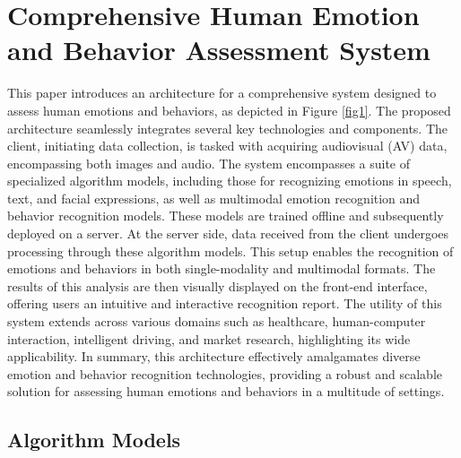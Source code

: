 \documentclass[preprint,12pt]{elsarticle}
\begin{document}
\section{Comprehensive Human Emotion and Behavior Assessment System}

This paper introduces an architecture for a comprehensive system designed to assess human emotions and behaviors, as depicted in Figure \ref{fig1}. The proposed architecture seamlessly integrates several key technologies and components. The client, initiating data collection, is tasked with acquiring audiovisual (AV) data, encompassing both images and audio. The system encompasses a suite of specialized algorithm models, including those for recognizing emotions in speech, text, and facial expressions, as well as multimodal emotion recognition and behavior recognition models. These models are trained offline and subsequently deployed on a server. At the server side, data received from the client undergoes processing through these algorithm models. This setup enables the recognition of emotions and behaviors in both single-modality and multimodal formats. The results of this analysis are then visually displayed on the front-end interface, offering users an intuitive and interactive recognition report. The utility of this system extends across various domains such as healthcare, human-computer interaction, intelligent driving, and market research, highlighting its wide applicability. In summary, this architecture effectively amalgamates diverse emotion and behavior recognition technologies, providing a robust and scalable solution for assessing human emotions and behaviors in a multitude of settings.




\subsection{Algorithm Models}
\end{document}

